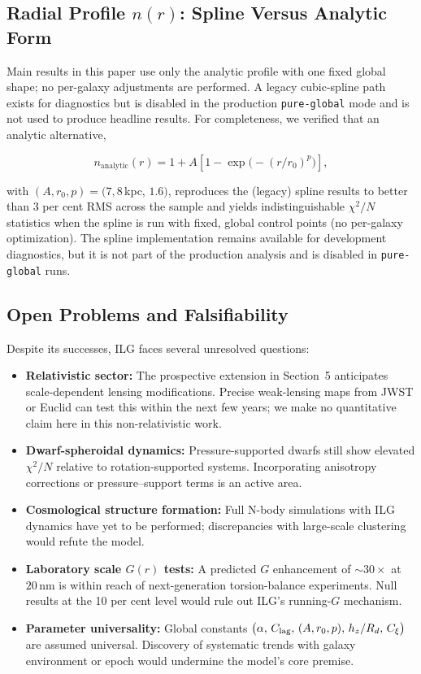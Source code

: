 \documentclass[usenatbib]{mnras}
\begin{document}
\subsection{Radial Profile $n(r)$: Spline Versus Analytic Form}

Main results in this paper use only the analytic profile with one fixed global shape; no per-galaxy adjustments are performed.  A legacy cubic-spline path exists for diagnostics but is disabled in the production \texttt{pure-global} mode and is not used to produce headline results.  For completeness, we verified that an analytic alternative,

\begin{equation}
n_\mathrm{analytic}(r) = 1 + A\left[1 - \exp\!\bigl(-(r/r_0)^p\bigr)\right],
\end{equation}

with $(A, r_0, p) = (7, 8$\,kpc, $1.6)$, reproduces the (legacy) spline results to better than 3 per cent RMS across the sample and yields indistinguishable $\chi^2/N$ statistics when the spline is run with fixed, global control points (no per-galaxy optimization).  The spline implementation remains available for development diagnostics, but it is not part of the production analysis and is disabled in \texttt{pure-global} runs.


\subsection{Open Problems and Falsifiability}

Despite its successes, ILG faces several unresolved questions:

\begin{itemize}
  \item \textbf{Relativistic sector:} The prospective extension in Section~5 anticipates scale-dependent lensing modifications. Precise weak-lensing maps from JWST or Euclid can test this within the next few years; we make no quantitative claim here in this non-relativistic work.
  \item \textbf{Dwarf-spheroidal dynamics:} Pressure-supported dwarfs still show elevated $\chi^2/N$ relative to rotation-supported systems.  Incorporating anisotropy corrections or pressure–support terms is an active area.
  \item \textbf{Cosmological structure formation:} Full N-body simulations with ILG dynamics have yet to be performed; discrepancies with large-scale clustering would refute the model.
  \item \textbf{Laboratory scale $G(r)$ tests:} A predicted $G$ enhancement of $\sim 30\times$ at $20$\,nm is within reach of next-generation torsion-balance experiments.  Null results at the 10 per cent level would rule out ILG's running-$G$ mechanism.
  \item \textbf{Parameter universality:} Global constants $\big(\alpha,\,C_{\rm lag},\,(A,r_0,p),\,h_z/R_d,\,C_\xi\big)$ are assumed universal. Discovery of systematic trends with galaxy environment or epoch would undermine the model's core premise.
\end{itemize}
\end{document}
